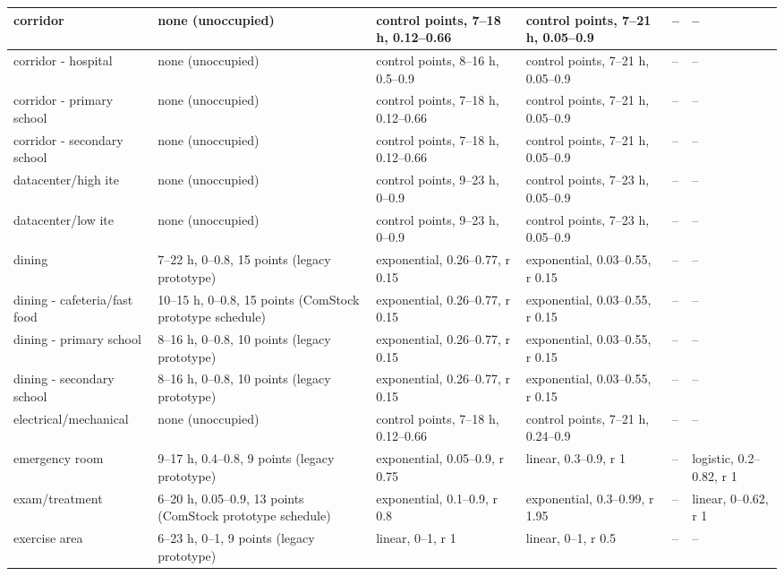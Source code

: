 \begin{center}
\begin{longtable}{|p{1.5in}|p{1.6in}|p{0.95in}|p{0.95in}|p{0.8in}|p{0.8in}|}
corridor & none (unoccupied) & control points, 7--18 h, 0.12--0.66 & control points, 7--21 h, 0.05--0.9 & -- & -- \\ \hline
corridor - hospital & none (unoccupied) & control points, 8--16 h, 0.5--0.9 & control points, 7--21 h, 0.05--0.9 & -- & -- \\ \hline
corridor - primary school & none (unoccupied) & control points, 7--18 h, 0.12--0.66 & control points, 7--21 h, 0.05--0.9 & -- & -- \\ \hline
corridor - secondary school & none (unoccupied) & control points, 7--18 h, 0.12--0.66 & control points, 7--21 h, 0.05--0.9 & -- & -- \\ \hline
datacenter/high ite & none (unoccupied) & control points, 9--23 h, 0--0.9 & control points, 7--23 h, 0.05--0.9 & -- & -- \\ \hline
datacenter/low ite & none (unoccupied) & control points, 9--23 h, 0--0.9 & control points, 7--23 h, 0.05--0.9 & -- & -- \\ \hline
dining & 7--22 h, 0--0.8, 15 points (legacy prototype) & exponential, 0.26--0.77, r 0.15 & exponential, 0.03--0.55, r 0.15 & -- & -- \\ \hline
dining - cafeteria/fast food & 10--15 h, 0--0.8, 15 points (ComStock prototype schedule) & exponential, 0.26--0.77, r 0.15 & exponential, 0.03--0.55, r 0.15 & -- & -- \\ \hline
dining - primary school & 8--16 h, 0--0.8, 10 points (legacy prototype) & exponential, 0.26--0.77, r 0.15 & exponential, 0.03--0.55, r 0.15 & -- & -- \\ \hline
dining - secondary school & 8--16 h, 0--0.8, 10 points (legacy prototype) & exponential, 0.26--0.77, r 0.15 & exponential, 0.03--0.55, r 0.15 & -- & -- \\ \hline
electrical/mechanical & none (unoccupied) & control points, 7--18 h, 0.12--0.66 & control points, 7--21 h, 0.24--0.9 & -- & -- \\ \hline
emergency room & 9--17 h, 0.4--0.8, 9 points (legacy prototype) & exponential, 0.05--0.9, r 0.75 & linear, 0.3--0.9, r 1 & -- & logistic, 0.2--0.82, r 1 \\ \hline
exam/treatment & 6--20 h, 0.05--0.9, 13 points (ComStock prototype schedule) & exponential, 0.1--0.9, r 0.8 & exponential, 0.3--0.99, r 1.95 & -- & linear, 0--0.62, r 1 \\ \hline
exercise area & 6--23 h, 0--1, 9 points (legacy prototype) & linear, 0--1, r 1 & linear, 0--1, r 0.5 & -- & -- \\ \hline

\end{longtable}
\end{center}
